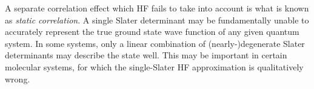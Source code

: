 \documentclass[../../master.tex]{subfiles}
\begin{document}
A separate correlation effect which HF fails to take into account is what is known as \emph{static correlation}. A single Slater determinant may be fundamentally unable to accurately represent the true ground state wave function of any given quantum system. In some systems, only a linear combination of (nearly-)degenerate Slater determinants may describe the state well. This may be important in certain molecular systems, for which the single-Slater HF approximation is qualitatively wrong. 


















 
\end{document}
